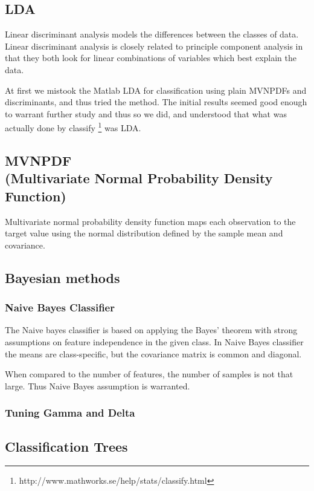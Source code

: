 \documentclass[a4paper,10pt]{article}
\begin{document}
\subsection{LDA}
Linear discriminant analysis models the differences between the classes of data. Linear discriminant analysis is closely related to principle component analysis in that they both look for linear combinations of variables which best explain the data.

At first we mistook the Matlab LDA for classification using plain MVNPDFs and discriminants, and thus tried the method. The initial results seemed good enough to warrant further study and thus so we did, and understood that what was actually done by classify \footnote{http://www.mathworks.se/help/stats/classify.html} was LDA.

\subsection{MVNPDF\\ {\small (Multivariate Normal Probability Density Function)}}
Multivariate normal probability density function maps each observation to the target value using the normal distribution defined by the sample mean and covariance.

\subsection{Bayesian methods}
\subsubsection{Naive Bayes Classifier}
The Naive bayes classifier is based on applying the Bayes’ theorem with strong assumptions on feature independence in the given class. In Naive Bayes classifier the means are class-specific, but the covariance matrix is common and diagonal.

When compared to the number of features, the number of samples is not that large. Thus Naive Bayes assumption is warranted.

\subsubsection{Tuning Gamma and Delta}

\subsection{Classification Trees}
\end{document}
